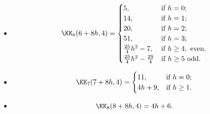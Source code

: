 \begin{definition}
\begin{itemize}
\begin{itemize}
\begin{itemize}
$$\begin{cases}
5,&\text{if\ } h=0;\\
13,&\text{if\ } h=1;\\
11h+15,&\text{if\ } h\geq 2.
\end{cases}$$
\item[] $$\KK_{6}(6+8h,4)=
\begin{cases}
5,&\text{if\ } h=0;\\
14,&\text{if\ } h=1;\\
20,&\text{if\ } h=2;\\
51,&\text{if\ } h=3;\\
\frac{25}{4}h^2-7,&\text{if\ } h\geq 4,\text{\ even},\\
\frac{25}{4}h^2-\frac{29}{4}&\text{if\ } h\geq 5\text{\ odd}.
\end{cases}$$
\item[] $$\KK_{7}(7+8h,4)=
\begin{cases}
11,&\text{if\ } h=0;\\
4h+9,&\text{if\ } h\geq 1.
\end{cases}$$
\item[] $$\KK_{8}(8+8h,4)=4h+6.$$
\end{itemize}
\end{itemize}
\end{itemize}
\end{definition}
